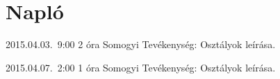 %
\section{Napló}

\begin{naplo}

\bejegyzes
{2015.04.03.~9:00}
{2 óra}
{Somogyi}
{Tevékenység: Osztályok leírása.}

\bejegyzes
{2015.04.07.~2:00}
{1 óra}
{Somogyi}
{Tevékenység: Osztályok leírása.}




\end{naplo}

